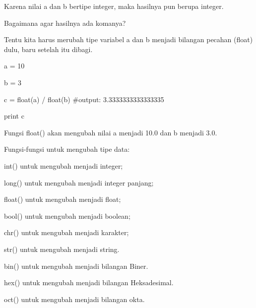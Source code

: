 \noindent 
Karena nilai $  $a $  $dan $  $b $  $bertipe integer, maka hasilnya pun berupa integer. \par
\noindent 
Bagaimana agar hasilnya ada komanya? \par
\noindent 
Tentu kita harus merubah tipe variabel $  $a $  $dan $  $b $  $menjadi bilangan pecahan (float) dulu, baru setelah itu dibagi. \par
\noindent 
a = 10 \par
\noindent 
b = 3 \par
\noindent 
c = float(a) / float(b)  $  \#  $output: 3.3333333333333335 \par
\vspace{12pt}
\noindent 
print c \par
\noindent 
Fungsi $  $float() $  $akan mengubah nilai $  $a $  $menjadi $  $10.0 $  $dan $  $b $  $menjadi $  $3.0. \par
\noindent 
Fungsi-fungsi untuk mengubah tipe data: \par
\noindent 
int() $  $untuk mengubah menjadi integer; \par
\noindent 
long() $  $untuk mengubah menjadi integer panjang; \par
\noindent 
float() $  $untuk mengubah menjadi float; \par
\noindent 
bool() $  $untuk mengubah menjadi boolean; \par
\noindent 
chr() $  $untuk mengubah menjadi karakter; \par
\noindent 
str() $  $untuk mengubah menjadi string. \par
\noindent 
bin() $  $untuk mengubah menjadi bilangan Biner. \par
\noindent 
hex() $  $untuk mengubah menjadi bilangan Heksadesimal. \par
\noindent 
oct() $  $untuk mengubah menjadi bilangan okta. \par
\vspace{12pt}
